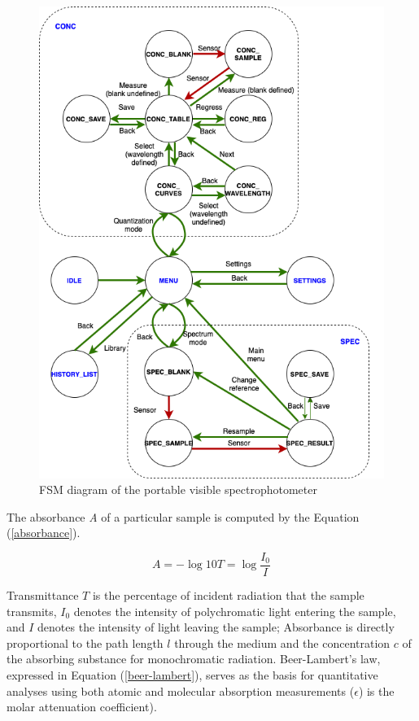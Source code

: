 \documentclass[conference]{IEEEtran}
\begin{document}
    \begin{figure}[htbp]
    \centerline{\includegraphics[scale=0.35]{fsm.png}}
    \caption{FSM diagram of the portable visible spectrophotometer}
    \label{fsm}
    \end{figure}

The absorbance \emph{A} of a particular sample is computed by the Equation (\ref{absorbance}).

    \begin{equation}
    A=-\log10{T}=\log{\frac{I_{0}}{I}}
    \label{absorbance}
    \end{equation}

Transmittance $T$ is the percentage of incident radiation that the sample transmits, $I_0$ denotes the intensity of polychromatic light entering the sample, and $I$ denotes the intensity of light leaving the sample;
Absorbance is directly proportional to the path length $l$ through the medium and the concentration $c$ of the absorbing substance for monochromatic radiation.
Beer-Lambert's law, expressed in Equation (\ref{beer-lambert}), serves as the basis for quantitative analyses using both atomic and molecular absorption measurements ($\epsilon$) is the molar attenuation coefficient)\cite{b4}.
\end{document}
